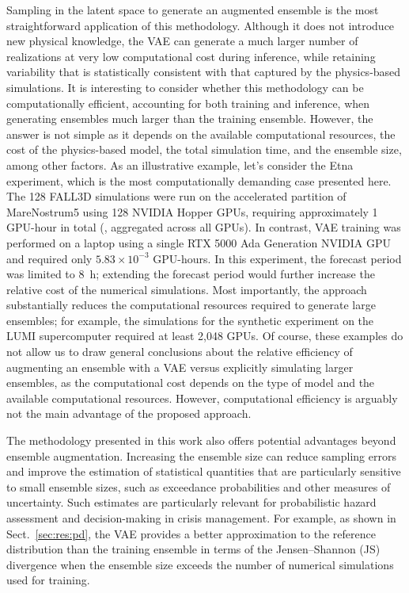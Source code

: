 %
%
Sampling in the latent space to generate an augmented ensemble is the most straightforward application of this methodology. Although it does not introduce new physical knowledge, the VAE can generate a much larger number of realizations at very low computational cost during inference, while retaining variability that is statistically consistent with that captured by the physics-based simulations.
%
%
It is interesting to consider whether this methodology can be computationally efficient, accounting for both training and inference, when generating ensembles much larger than the training ensemble. However, the answer is not simple as it depends on the available computational resources, the cost of the physics-based model, the total simulation time, and the ensemble size, among other factors. As an illustrative example, let's consider the Etna experiment, which is the most computationally demanding case presented here. The 128 FALL3D simulations were run on the accelerated partition of MareNostrum5 using 128 NVIDIA Hopper GPUs, requiring approximately 1 GPU-hour in total (\ie, aggregated across all GPUs). In contrast, VAE training was performed on a laptop using a single RTX 5000 Ada Generation NVIDIA GPU and required only $5.83 \times 10^{-3}$ GPU-hours. In this experiment, the forecast period was limited to 8~h; extending the forecast period would further increase the relative cost of the numerical simulations. Most importantly, the approach substantially reduces the computational resources required to generate large ensembles; for example, the simulations for the synthetic experiment on the LUMI supercomputer required at least 2,048 GPUs. Of course, these examples do not allow us to draw general conclusions about the relative efficiency of augmenting an ensemble with a VAE versus explicitly simulating larger ensembles, as the computational cost depends on the type of model and the available computational resources. However, computational efficiency is arguably not the main advantage of the proposed approach.

%
%
The methodology presented in this work also offers potential advantages beyond ensemble augmentation. Increasing the ensemble size can reduce sampling errors and improve the estimation of statistical quantities that are particularly sensitive to small ensemble sizes, such as exceedance probabilities and other measures of uncertainty. Such estimates are particularly relevant for probabilistic hazard assessment and decision-making in crisis management. For example, as shown in Sect.~\ref{sec:res:pd}, the VAE provides a better approximation to the reference distribution than the training ensemble in terms of the Jensen--Shannon (JS) divergence when the ensemble size exceeds the number of numerical simulations used for training.

